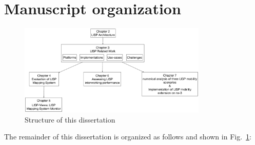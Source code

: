 \section{Manuscript organization}
\label{sec:intro_structure}
\begin{figure}[t]
	\centering
	\includegraphics[width=0.8\textwidth]{Pics/structure_thesis.eps}
	\caption{Structure of this dissertation}
	\label{structure_thesis}
\end{figure}
The remainder of this dissertation is organized as follows and shown in Fig.~\ref{structure_thesis}:
